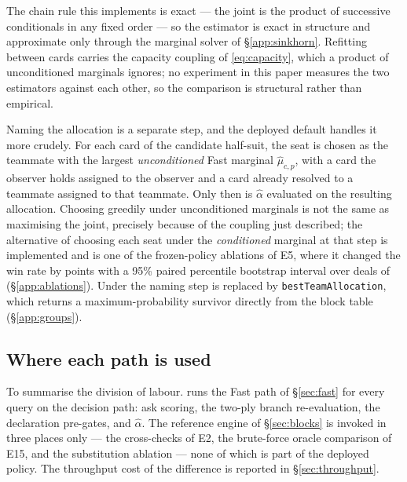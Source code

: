 The chain rule this implements is exact --- the joint is the product of
successive conditionals in any fixed order --- so the estimator is exact in
structure and approximate only through the marginal solver of
\S\ref{app:sinkhorn}. Refitting between cards carries the capacity coupling of
\eqref{eq:capacity}, which a product of unconditioned marginals ignores; no
experiment in this paper measures the two estimators against each other, so the
comparison is structural rather than empirical.

Naming the allocation is a separate step, and the deployed default handles it
more crudely. For each card of the candidate half-suit, the seat is chosen as the
teammate with the largest \emph{unconditioned} Fast marginal $\hat\mu_{c,p}$,
with a card the observer holds assigned to the observer and a card already
resolved to a teammate assigned to that teammate. Only then is $\hat\alpha$
evaluated on the resulting allocation. Choosing greedily under unconditioned
marginals is not the same as maximising the joint, precisely because of the
coupling just described; the alternative of choosing each seat under the
\emph{conditioned} marginal at that step is implemented and is one of the
frozen-policy ablations of E5, where it changed the win rate by \numAblGmap{}
points with a 95\% paired percentile bootstrap interval over deals of
\numAblGmapCI{} (\S\ref{app:ablations}). Under
\vblock{} the naming step is replaced by \texttt{bestTeamAllocation}, which
returns a maximum-probability survivor directly from the block table
(\S\ref{app:groups}).

\subsection{Where each path is used}
\label{app:paths}

To summarise the division of labour. \vfast{} runs the Fast path of
\S\ref{sec:fast} for every query on the decision path: ask scoring, the two-ply
branch re-evaluation, the declaration pre-gates, and $\hat\alpha$. The reference
engine of \S\ref{sec:blocks} is invoked in three places only --- the cross-checks
of E2, the brute-force oracle comparison of E15, and the \vblock{} substitution
ablation --- none of which is part of the deployed policy. The throughput cost of
the difference is reported in \S\ref{sec:throughput}.
